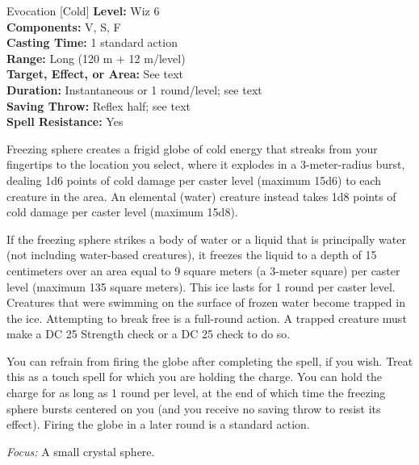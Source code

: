 {Evocation [Cold]}
{
	\textbf{Level:}
	Wiz 6\\
	\textbf{Components:}
	V, S, F\\
	\textbf{Casting Time:}
	1 standard action\\
	\textbf{Range:}
	Long (120 m + 12 m/level)\\
	\textbf{Target, Effect, or Area:}
	See text\\
	\textbf{Duration:}
	Instantaneous or 1 round/level; see text\\
	\textbf{Saving Throw:}
	Reflex half; see text\\
	\textbf{Spell Resistance:}
	Yes\\
}
{
	Freezing sphere creates a frigid globe of cold energy that streaks from your fingertips to the location you select, where it explodes in a 3-meter-radius burst, dealing 1d6 points of cold damage per caster level (maximum 15d6) to each creature in the area. An elemental (water) creature instead takes 1d8 points of cold damage per caster level (maximum 15d8).

	If the freezing sphere strikes a body of water or a liquid that is principally water (not including water-based creatures), it freezes the liquid to a depth of 15 centimeters over an area equal to 9 square meters (a 3-meter square) per caster level (maximum 135 square meters). This ice lasts for 1 round per caster level. Creatures that were swimming on the surface of frozen water become trapped in the ice. Attempting to break free is a full-round action. A trapped creature must make a DC 25 Strength check or a DC 25  check to do so.

	You can refrain from firing the globe after completing the spell, if you wish. Treat this as a touch spell for which you are holding the charge. You can hold the charge for as long as 1 round per level, at the end of which time the freezing sphere bursts centered on you (and you receive no saving throw to resist its effect). Firing the globe in a later round is a standard action.

	\textit{Focus:}
	A small crystal sphere.

}
